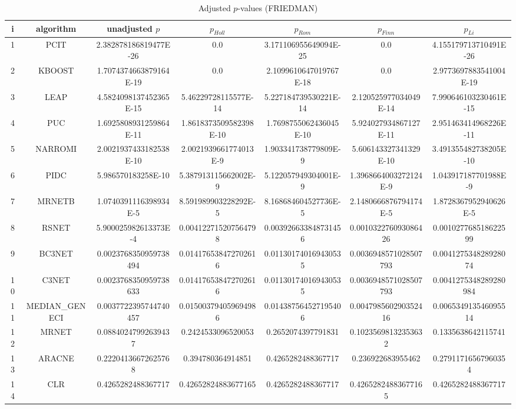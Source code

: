 \documentclass[a4paper,10pt]{article}
\begin{document}
\begin{landscape}
\begin{table}[!htp]
\centering\scriptsize
\caption{Adjusted $p$-values (FRIEDMAN)}
\begin{tabular}{ccccccc}
i&algorithm&unadjusted $p$&$p_{Holl}$&$p_{Rom}$&$p_{Finn}$&$p_{Li}$\\
\hline
1&PCIT&2.382878186819477E-26&0.0&3.171106955649094E-25&0.0&4.155179713710491E-26\\
2&KBOOST&1.7074374663879164E-19&0.0&2.1099610647019767E-18&0.0&2.9773697883541004E-19\\
3&LEAP&4.5824098137452365E-15&5.46229728115577E-14&5.227184739530221E-14&2.120525977034049E-14&7.990646103230461E-15\\
4&PUC&1.6925808931259864E-11&1.8618373509582398E-10&1.7698755062436045E-10&5.924027934867127E-11&2.951463414968226E-11\\
5&NARROMI&2.0021937433182538E-10&2.0021939661774013E-9&1.903341738779809E-9&5.606143327341329E-10&3.491355482738205E-10\\
6&PIDC&5.986570183258E-10&5.387913115662002E-9&5.122057949304001E-9&1.3968664003272124E-9&1.043917187701988E-9\\
7&MRNETB&1.0740391116398934E-5&8.591989903228292E-5&8.168684604527736E-5&2.1480666876794174E-5&1.8728367952940626E-5\\
8&RSNET&5.900025982613373E-4&0.004122715207564798&0.003926633848731456&0.001032276093086426&0.001027768518622599\\
9&BC3NET&0.0023768350959738494&0.014176538472702616&0.011301740169430535&0.0036948571028507793&0.004127534828928074\\
10&C3NET&0.0023768350959738633&0.014176538472702616&0.011301740169430535&0.0036948571028507793&0.0041275348289280984\\
11&MEDIAN_GENECI&0.0037722395744740457&0.015003794059694986&0.014387564527195406&0.004798560290352416&0.006534913546095514\\
12&MRNET&0.08840247992639437&0.2424533096520053&0.2652074397791831&0.10235698132353632&0.1335638642115741\\
13&ARACNE&0.22204136672625768&0.394780364914851&0.4265282488367717&0.236922683955462&0.27911716567960354\\
14&CLR&0.4265282488367717&0.42652824883677165&0.4265282488367717&0.42652824883677165&0.4265282488367717\\
\hline
\end{tabular}
\end{table}


\newpage


\end{landscape}
\end{document}
